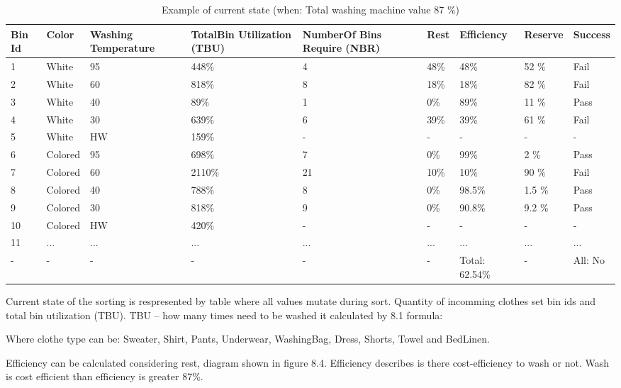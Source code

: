 \begin{table}[h]
	
    \begin{tabular}{ | p{0.4cm} | p{1cm} | p{2cm} | p{1.7cm} |p{2cm} |p{1cm} |p{1.3cm} |p{1.2cm} |p{1.3cm} |}
    \hline
	Bin Id & Color & Washing Temperature & TotalBin Utilization (TBU) & NumberOf Bins Require (NBR) & Rest & Efficiency & Reserve & Success\\ \hline
	1 & White & 95 & 448\% & 4 & 48\% & 48\% & 52 \% & Fail \\ \hline
	2 & White & 60 & 818\% & 8 & 18\% & 18\% & 82 \% & Fail \\ \hline
	3 & White & 40 & 89\% & 1 & 0\% & 89\% & 11 \% & Pass \\ \hline
	4 & White & 30 & 639\% & 6 & 39\% & 39\% & 61 \% & Fail \\ \hline
	5 & White & HW & 159\% & - & - & - & - & - \\ \hline
	6 & Colored & 95 & 698\% & 7 & 0\% & 99\% & 2 \% & Pass \\ \hline
	7 & Colored & 60 & 2110\% & 21 & 10\% & 10\% & 90 \% & Fail \\ \hline
	8 & Colored & 40 & 788\% & 8 & 0\% & 98.5\% & 1.5 \% & Pass \\ \hline
	9 & Colored & 30 & 818\% & 9 & 0\% & 90.8\% & 9.2 \% & Pass \\ \hline
	10 & Colored & HW & 420\% & - & - & - & - & - \\ \hline
	11 & ... & ... & ... & ... & ... & ... & ... & ... \\ \hline
	- & - & - & - & - & - & Total: 62.54\% & - & All: No \\ \hline
    \end{tabular}
	\caption{Example of current state (when: Total washing machine value 87 \%)}
	\label{tab:AdDis}
\end{table}

Current state of the sorting is respresented by table where all values mutate during sort. Quantity of incomming clothes set bin ids and total bin utilization (TBU). TBU – how many times need to be washed it calculated by 8.1 formula:

Where clothe type can be: Sweater, Shirt, Pants, Underwear, WashingBag, Dress, Shorts, Towel and BedLinen. 



Efficiency can be calculated considering rest, diagram shown in figure 8.4. Efficiency describes is there cost-efficiency to wash or not. Wash is cost efficient than efficiency is greater 87\%.


